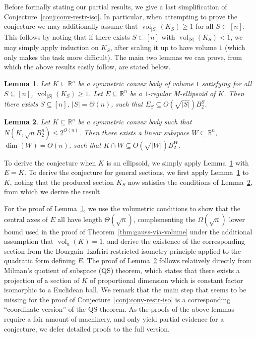 \documentclass[12pt]{article}
\newtheorem{lemma}{Lemma}
\newcommand{\R}{{\mathbb{R}}}
\DeclareMathOperator{\vol}{vol}
\begin{document}
Before formally stating our partial results, we give a last simplification of
Conjecture~\ref{conj:conv-restr-iso}. In particular, when attempting to prove
the conjecture we may additionally assume that $\vol_{|S|}(K_S) \geq 1$ for all
$S \subset [n]$. This follows by noting that if there exists $S \subset [n]$
with $\vol_{|S|}(K_S) < 1$, we may simply apply induction on $K_S$, after
scaling it up to have volume $1$ (which only makes the task more difficult). The
main two lemmas we can prove, from which the above results easily follow,
are stated below. 

\begin{lemma}
\label{lem:axis-m-ell}
Let $K \subseteq \R^n$ be a symmetric convex body of volume $1$ satisfying
for all $S \subseteq [n]$, $\vol_{|S|}(K_S) \geq 1$. Let $E \subseteq \R^n$ be a
$1$-regular M-ellipsoid of $K$. Then there exists $S \subseteq [n]$, $|S| =
\Theta(n)$, such that $E_S \subseteq O(\sqrt{|S|}) B_2^S$.
\end{lemma}

\begin{lemma}
\label{lem:cover-to-section}
Let $K \subseteq \R^n$ be a symmetric convex body such that $N(K,\sqrt{n}B_2^n)
\leq 2^{O(n)}$. Then there exists a linear subspace $W \subseteq \R^n$, $\dim(W) =
\Theta(n)$, such that $K \cap W \subseteq O(\sqrt{|W|}) B_2^W$.  
\end{lemma}

To derive the conjecture when $K$ is an ellipsoid, we simply apply
Lemma~\ref{lem:axis-m-ell} with $E=K$. To derive the conjecture for general
sections, we first apply Lemma~\ref{lem:axis-m-ell} to $K$, noting that the
produced section $K_S$ now satisfies the conditions of
Lemma~\ref{lem:cover-to-section}, from which we derive the result.  

For the proof of Lemma~\ref{lem:axis-m-ell}, we use the volumetric conditions to
show that the central axes of $E$ all have length $\Theta(\sqrt{n})$,
complementing the $\Omega(\sqrt{n})$ lower bound used in the proof of
Theorem~\ref{thm:gauss-via-volume} under the additional assumption that
$\vol_n(K)=1$, and derive the existence of the
corresponding section from the Bourgain-Tzafriri restricted isometry principle
applied to the quadratic form defining $E$. The proof of
Lemma~\ref{lem:cover-to-section} follows relatively directly from Milman's
quotient of subspace (QS) theorem, which states that there exists a projection
of a section of $K$ of proportional dimension which is constant factor
isomorphic to a Euclidean ball. We remark that the main step that seems to be
missing for the proof of Conjecture~\ref{conj:conv-restr-iso} is a
corresponding ``coordinate version'' of the QS theorem. As the proofs of the
above lemmas require a fair amount of machinery, and only yield partial evidence
for a conjecture, we defer detailed proofs to the full version.  
\end{document}

